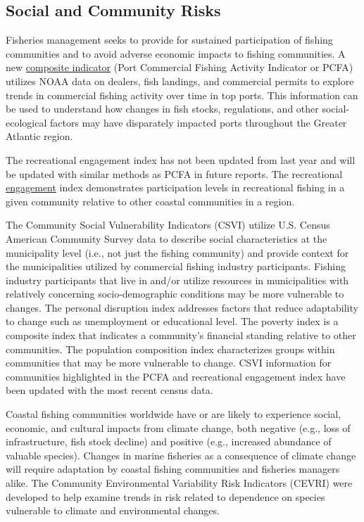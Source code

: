 \documentclass[
  10pt,
]{article}
\begin{document}
\subsection{Social and Community Risks}\label{social-and-community-risks}

Fisheries management seeks to provide for sustained participation of fishing communities and to avoid adverse economic impacts to fishing communities. A new \href{https://noaa-edab.github.io/catalog/engagement.html?q=engage\#introduction-to-indicator-72}{composite indicator} (Port Commercial Fishing Activity Indicator or PCFA) utilizes NOAA data on dealers, fish landings, and commercial permits to explore trends in commercial fishing activity over time in top ports. This information can be used to understand how changes in fish stocks, regulations, and other social-ecological factors may have disparately impacted ports throughout the Greater Atlantic region.

The recreational engagement index has not been updated from last year and will be updated with similar methods as PCFA in future reports. The recreational \href{https://noaa-edab.github.io/catalog/engagement.html}{engagement} index demonstrates participation levels in recreational fishing in a given community relative to other coastal communities in a region.

The Community Social Vulnerability Indicators (CSVI) utilize U.S. Census American Community Survey data to describe social characteristics at the municipality level (i.e., not just the fishing community) and provide context for the municipalities utilized by commercial fishing industry participants. Fishing industry participants that live in and/or utilize resources in municipalities with relatively concerning socio-demographic conditions may be more vulnerable to changes. The personal disruption index addresses factors that reduce adaptability to change such as unemployment or educational level. The poverty index is a composite index that indicates a community's financial standing relative to other communities. The population composition index characterizes groups within communities that may be more vulnerable to change. CSVI information for communities highlighted in the PCFA and recreational engagement index have been updated with the most recent census data.

Coastal fishing communities worldwide have or are likely to experience social, economic, and cultural impacts from climate change, both negative (e.g., loss of infrastructure, fish stock decline) and positive (e.g., increased abundance of valuable species). Changes in marine fisheries as a consequence of climate change will require adaptation by coastal fishing communities and fisheries managers alike. The Community Environmental Variability Risk Indicators (CEVRI) were developed to help examine trends in risk related to dependence on species vulnerable to climate and environmental changes.
\end{document}
